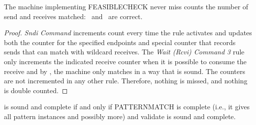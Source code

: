 \begin{cor}
  The machine implementing \textrm{FEASIBLECHECK} never miss counts the number of send and receives matched: \eprcv\ and \epsnd\ are correct.
\end{cor}
\label{cor:count}
\begin{proof}
  \emph{Sndi Command} increments count every time the rule activates and updates both the counter for the specified endpoints and special counter that records sends that can match with wildcard receives. The \emph{Wait (Rcvi) Command 3} rule only increments the indicated receive counter when it is possible to consume the receive and by , the machine only matches in a way that is sound. The counters are not incremented in any other rule. Therefore, nothing is missed, and nothing is double counted.
\end{proof}
\begin{cor}
   is sound and complete if and only if \textrm{PATTERNMATCH} is complete (i.e., it gives all pattern instances and possibly more) and validate is sound and complete.
\end{cor}


